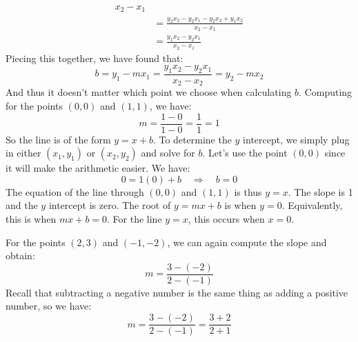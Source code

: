 \documentclass[crop=false,class=book,oneside]{standalone}                      %
\begin{document}
\begin{solution}
\begin{subequations}
\begin{align}
                               {x_{2}-x_{1}}\\
                        &=\frac{y_{2}x_{2}-y_{2}x_{1}-y_{2}x_{2}+y_{1}x_{2}}
                               {x_{2}-x_{1}}\\
                        &=\frac{y_{1}x_{2}-y_{2}x_{1}}{x_{2}-x_{1}}
                    \end{align}
                \end{subequations}
            \endgroup
            Piecing this together, we have found that:
            \begin{equation}
                b=y_{1}-mx_{1}
                 =\frac{y_{1}x_{2}-y_{2}x_{1}}{x_{2}-x_{2}}
                 =y_{2}-mx_{2}
            \end{equation}
            And thus it doesn't matter which point we choose when calculating
            $b$. Computing for the points $(0,0)$ and $(1,1)$, we have:
            \begin{equation}
                m=\frac{1-0}{1-0}=\frac{1}{1}=1
            \end{equation}
            So the line is of the form $y=x+b$. To determine the $y$ intercept,
            we simply plug in either $(x_{1},y_{1})$ or $(x_{2},y_{2})$ and
            solve for $b$. Let's use the point $(0,0)$ since it will make the
            arithmetic easier. We have:
            \begin{equation}
                0=1(0)+b
                \quad\Longrightarrow\quad
                b=0
            \end{equation}
            The equation of the line through $(0,0)$ and $(1,1)$ is thus
            $y=x$. The slope is 1 and the $y$ intercept is zero. The root
            of $y=mx+b$ is when $y=0$. Equivalently, this is when
            $mx+b=0$. For the line $y=x$, this occurs when $x=0$.
            \par\hfill\par
            For the points $(2,3)$ and $(\minus{1},\minus{2})$, we can again
            compute the slope and obtain:
            \begin{equation}
                m=\frac{3-(\minus{2})}{2-(\minus{1})}
            \end{equation}
            Recall that subtracting a negative number is the same thing as
            adding a positive number, so we have:
            \begin{equation}
                m=\frac{3-(\minus{2})}{2-(\minus{1})}
                 =\frac{3+2}{2+1}

\end{equation}
\end{solution}
\end{document}
